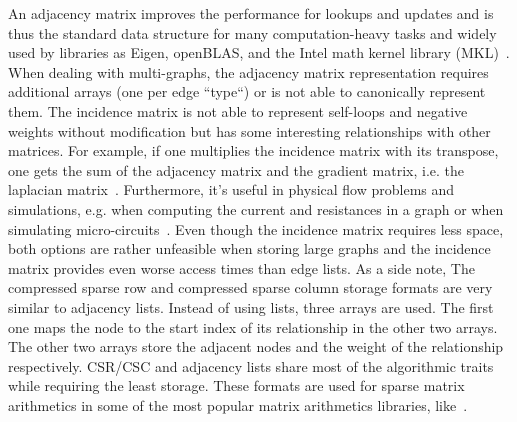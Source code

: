             An adjacency matrix improves the performance for lookups and updates and is thus the standard data structure for many computation-heavy tasks and widely used by libraries as Eigen, openBLAS, and the Intel math kernel library (MKL)~\autocite{MatrixStorageSchemes-2021-03-05, EigenTheMatrixclass-2020-12-05, MatrixStorageSchemes-1999-10-01}. 
            When dealing with multi-graphs, the adjacency matrix representation requires additional arrays (one per edge ``type``) or is not able to canonically represent them.       
            The incidence matrix is not able to represent self-loops and negative weights without modification but has some interesting relationships with other matrices. 
            For example, if one multiplies the incidence matrix with its transpose, one gets the sum of the adjacency matrix and the gradient matrix, i.e. the laplacian matrix~\autocite{brouwer2011spectra}. 
            Furthermore, it's useful in physical flow problems and simulations, e.g. when computing the current and resistances in a graph or when simulating micro-circuits~\autocite{weinberg1958kirchhoff}.
            Even though the incidence matrix requires less space, both options are rather unfeasible when storing large graphs and the incidence matrix provides even worse access times than edge lists.        
            As a side note, The compressed sparse row and compressed sparse column storage formats are very similar to adjacency lists. 
            Instead of using lists, three arrays are used. 
            The first one maps the node to the start index of its relationship in the other two arrays. 
            The other two arrays store the adjacent nodes and the weight of the relationship respectively. 
            CSR/CSC and adjacency lists share most of the algorithmic traits while requiring the least storage. 
            These formats are used for sparse matrix arithmetics in some of the most popular matrix arithmetics libraries, like~\autocite{MatrixStorageSchemes-2021-03-05, EigenTheMatrixclass-2020-12-05, MatrixStorageSchemes-1999-10-01}. 
            
